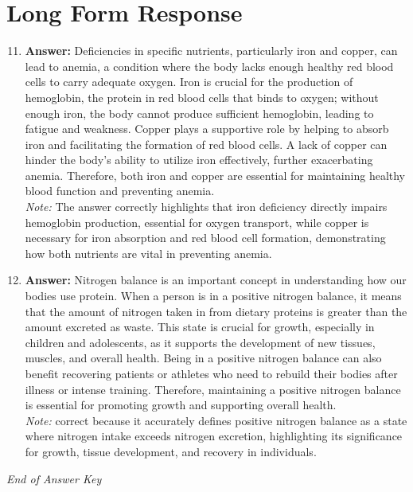 \documentclass[12pt]{article}
\begin{document}
\section*{Long Form Response}
\begin{enumerate}[label=\arabic*.]
\setcounter{enumi}{10}
\item \textbf{Answer:} Deficiencies in specific nutrients, particularly iron and copper, can lead to anemia, a condition where the body lacks enough healthy red blood cells to carry adequate oxygen. Iron is crucial for the production of hemoglobin, the protein in red blood cells that binds to oxygen; without enough iron, the body cannot produce sufficient hemoglobin, leading to fatigue and weakness. Copper plays a supportive role by helping to absorb iron and facilitating the formation of red blood cells. A lack of copper can hinder the body's ability to utilize iron effectively, further exacerbating anemia. Therefore, both iron and copper are essential for maintaining healthy blood function and preventing anemia.
\\ \textit{Note:} The answer correctly highlights that iron deficiency directly impairs hemoglobin production, essential for oxygen transport, while copper is necessary for iron absorption and red blood cell formation, demonstrating how both nutrients are vital in preventing anemia.
\item \textbf{Answer:} Nitrogen balance is an important concept in understanding how our bodies use protein. When a person is in a positive nitrogen balance, it means that the amount of nitrogen taken in from dietary proteins is greater than the amount excreted as waste. This state is crucial for growth, especially in children and adolescents, as it supports the development of new tissues, muscles, and overall health. Being in a positive nitrogen balance can also benefit recovering patients or athletes who need to rebuild their bodies after illness or intense training. Therefore, maintaining a positive nitrogen balance is essential for promoting growth and supporting overall health.
\\ \textit{Note:} correct because it accurately defines positive nitrogen balance as a state where nitrogen intake exceeds nitrogen excretion, highlighting its significance for growth, tissue development, and recovery in individuals.
\end{enumerate}

\vfill
\noindent\textit{End of Answer Key}
\end{document}
